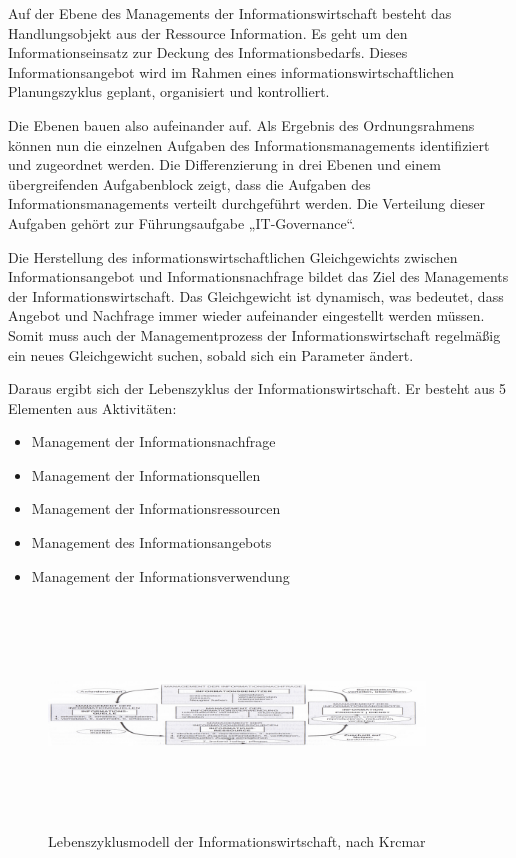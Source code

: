 Auf der Ebene des Managements der Informationswirtschaft besteht das Handlungsobjekt aus der Ressource Information. Es geht um den Informationseinsatz zur Deckung des Informationsbedarfs. Dieses Informationsangebot wird im Rahmen eines informationswirtschaftlichen Planungszyklus geplant, organisiert und kontrolliert.

Die Ebenen bauen also aufeinander auf. Als Ergebnis des Ordnungsrahmens können nun die einzelnen Aufgaben des Informationsmanagements identifiziert und zugeordnet werden. Die Differenzierung in drei Ebenen und einem übergreifenden Aufgabenblock zeigt, dass die Aufgaben des Informationsmanagements verteilt durchgeführt werden. Die Verteilung dieser Aufgaben gehört zur Führungsaufgabe „IT-Governance“.

Die Herstellung des informationswirtschaftlichen Gleichgewichts zwischen Informationsangebot und Informationsnachfrage bildet das Ziel des Managements der Informationswirtschaft. Das Gleichgewicht ist dynamisch, was bedeutet, dass Angebot und Nachfrage immer wieder aufeinander eingestellt werden müssen. Somit muss auch der Managementprozess der Informationswirtschaft regelmäßig ein neues Gleichgewicht suchen, sobald sich ein Parameter ändert.

Daraus ergibt sich der Lebenszyklus der Informationswirtschaft. Er besteht aus 5 Elementen aus Aktivitäten:
\begin{itemize}
	\item Management der Informationsnachfrage
	\item Management der Informationsquellen
	\item Management der Informationsressourcen
	\item Management des Informationsangebots
	\item Management der Informationsverwendung
\end{itemize}

\begin{figure}[h!]
	\centering
	\includegraphics[width=10cm, height=6cm]
	{kapitel/gruppe1_1/bilder/lebenszyklus_der_informationswirtschaft}
	\caption{Lebenszyklusmodell der Informationswirtschaft, nach Krcmar}
	\label{fig_lebenszyklus_informationswirtschaft}
\end{figure}

